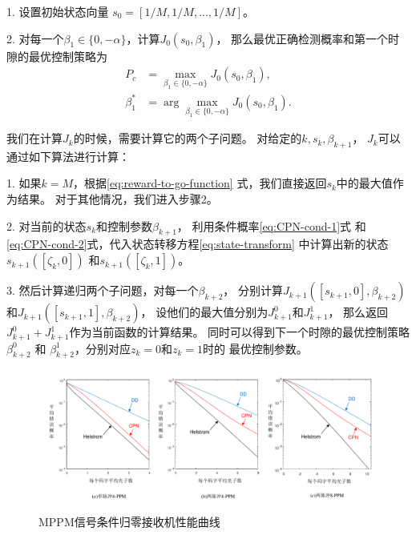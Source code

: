 1. 设置初始状态向量 $s_0=[1/M,1/M, ..., 1/M]$。

2. 对每一个$\beta_{1} \in \{0, -\alpha \}$，计算$J_0(s_0, \beta_1)$，
   那么最优正确检测概率和第一个时隙的最优控制策略为
   \begin{equation}
   \begin{split}
   P_c &= \max_{\beta_1 \in \{0, -\alpha \} } J_0(s_0, \beta_1), \\
   \beta_1^* &= \arg \max_{\beta_1 \in \{0, -\alpha \} } J_0(s_0, \beta_1).
   \end{split}
   \end{equation}

我们在计算$J_k$的时候，需要计算它的两个子问题。
对给定的$k, s_k, \beta_{k+1}$，
$J_k$可以通过如下算法进行计算：

1. 如果$k=M$，根据\ref{eq:reward-to-go-function}
   式，我们直接返回$s_k$中的最大值作为结果。
   对于其他情况，我们进入步骤2。
   
2. 对当前的状态$s_k$和控制参数$\beta_{k+1}$，
   利用条件概率\ref{eq:CPN-cond-1}式
   和\ref{eq:CPN-cond-2}式，代入状态转移方程\ref{eq:state-transform}
   中计算出新的状态$s_{k+1}([\zeta_k, 0])$
   和$s_{k+1}([\zeta_k, 1])$。
   
3. 然后计算递归两个子问题，对每一个$\beta_{k+2}$，
   分别计算$J_{k+1}([s_{k+1},0], \beta_{k+2})$
   和$J_{k+1}([s_{k+1},1], \beta_{k+2})$，
   设他们的最大值分别为$J_{k+1}^0$和$J_{k+1}^1$，
   那么返回$J_{k+1}^0 + J_{k+1}^1$作为当前函数的计算结果。
   同时可以得到下一个时隙的最优控制策略$\beta_{k+2}^0$
   和 $\beta_{k+2}^1$，分别对应$z_k=0$和$z_k=1$时的
   最优控制参数。
   
   
\begin{figure}
\centering
  \includegraphics[width=\textwidth]{figures/chap4/4MPPM-error}
  \caption{MPPM信号条件归零接收机性能曲线}
  \label{fig:4MPPM-error}
\end{figure}

